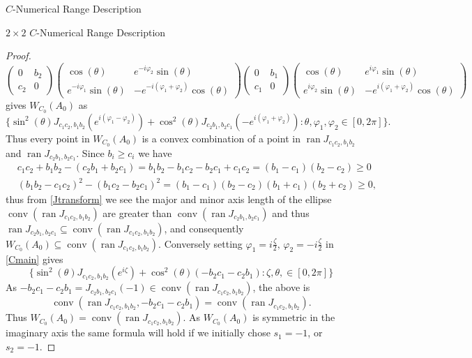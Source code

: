 \documentclass[12pt]{article}
\theoremstyle{plain}
\theoremstyle{definition}
\theoremstyle{remark}
\renewcommand{\phi}{\varphi}
\newcommand{\ran}{\operatorname{ran}}
\numberwithin{equation}{section}
\begin{document}
\begin{section}{$C$-Numerical Range Description}
\begin{subsection}{$2 \times 2$ $C$-Numerical Range Description}
\begin{proof}
$$
\begin{pmatrix}
    0 & b_2 \\
    c_2 & 0
\end{pmatrix} \begin{pmatrix}
    \cos (\theta) & e^{-i \phi_2} \sin (\theta) \\
     e^{-i \phi_1} \sin (\theta)& -e^{-i (\phi_1+ \phi_2)} \cos (\theta)
\end{pmatrix}   \begin{pmatrix}
    0 & b_1 \\
    c_1 & 0
\end{pmatrix}\begin{pmatrix}
    \cos (\theta) & e^{i \phi_1} \sin (\theta) \\
    e^{i \phi_2} \sin (\theta) & -e^{i (\phi_1+ \phi_2)} \cos (\theta)
\end{pmatrix}
$$
gives $W_{C_0}(A_0) $ as
\begin{equation}\label{Cmain}
\{ \sin^2 (\theta) J_{c_1c_2,b_1b_2}(e^{i( \phi_1 - \phi_2)}  ) +  \cos^2( \theta) J_{c_2b_1, b_2c_1} (-e^{i (\phi_1 +\phi_2) }):\theta, \phi_1, \phi_2 \in [0, 2 \pi] \}.
\end{equation}
Thus every point in $W_{C_0}(A_0)$ is a convex combination of a point in $ \ran J_{c_1c_2, b_1b_2}$ and $ \ran J_{c_2b_1, b_2c_1}$. Since $b_i \geq c_i$ we have \begin{align}
&c_1 c_2 + b_1 b_2 - (c_2 b_1 + b_2 c_1)
= b_1 b_2 - b_1 c_2 - b_2 c_1 + c_1 c_2
= (b_1 - c_1)(b_2 - c_2) \geq 0 \\
&(b_1 b_2 - c_1 c_2)^2 - (b_1 c_2 - b_2 c_1)^2
= (b_1 - c_1)(b_2 - c_2)(b_1 + c_1)(b_2 + c_2)
\geq 0,
\end{align}
thus from \eqref{Jtransform} we see the major and minor axis length of the ellipse $\operatorname{conv}(\ran J_{c_1c_2, b_1b_2})$ are greater than $\operatorname{conv}(\ran J_{c_2b_1, b_2c_1}) $ and thus $\ran J_{c_2b_1, b_2c_1}\subseteq \operatorname{conv}(\ran J_{c_1c_2, b_1b_2})$, and consequently $W_{C_0}(A_0) \subseteq \operatorname{conv}(\ran J_{c_1c_2, b_1b_2})$. Conversely setting $\phi_1 =i \frac{\zeta}{2}, \,  \phi_2 = -i \frac{\zeta}{2}$ in \eqref{Cmain} gives
$$
\{\sin^2(\theta) J_{c_1c_2, b_1b_2}(e^{i\zeta}) + \cos^2 (\theta) (-b_2c_1 - c_2b_1): \zeta, \theta, \in [0, 2 \pi]\}
$$
As $-b_2c_1 - c_2b_1 = J_{c_2b_1, b_2c_1}(-1) \in \operatorname{conv}(\ran J_{c_1c_2, b_1b_2})$, the above is 
$$
\operatorname{conv}(\ran J_{c_1c_2, b_1b_2}, -b_2c_1 - c_2b_1) = \operatorname{conv}(\ran J_{c_1c_2, b_1b_2}).
$$
Thus $W_{C_0}(A_0) = \operatorname{conv}(\ran J_{c_1c_2, b_1b_2})$. As $W_{C_0}(A_0)$ is symmetric in the imaginary axis the same formula will hold if we initially chose $s_1=-1$, or $s_2= -1.$ 



\end{proof}
\end{subsection}
\end{section}
\end{document}
